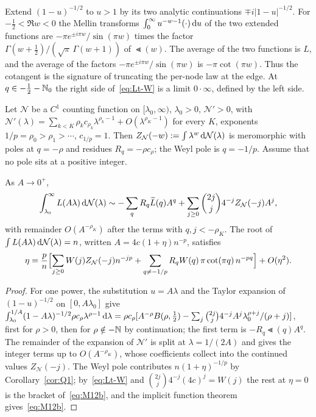 Extend $(1-u)^{-1/2}$ to $u>1$ by its two analytic continuations $\mp i|1-u|^{-1/2}$. For $-\frac12<\Re w<0$ the Mellin transforms
$\int_0^\infty u^{-w-1}(\cdot)\,\mathrm{d} u$ of the two extended functions are $-\pi e^{\pm i\pi w}/\sin(\pi w)$ times the factor
$\Gamma(w+\frac12)/(\sqrt\pi\,\Gamma(w+1))$ of $\Lt(w)$. The average of the two functions is $L$, and the average of the factors
$-\pi e^{\pm i\pi w}/\sin(\pi w)$ is $-\pi\cot(\pi w)$. Thus the cotangent is the signature of truncating the per-node law at
the edge. At $q\in-\frac12-\mathbb{N}_0$ the right side of~\eqref{eq:Lt-W} is a limit $0\cdot\infty$, defined by the left side.

Let $\mathcal N$ be a $C^1$ counting function on $[\lambda_0,\infty)$, $\lambda_0>0$, $\mathcal N'>0$, with
$\mathcal N'(\lambda)=\sum_{k<K}\rho_kc_{\rho_k}\lambda^{\rho_k-1}+O(\lambda^{\rho_K-1})$ for every $K$, exponents $1/p=\rho_0>\rho_1>\dotsb$,
$c_{1/p}=1$. Then $Z_{\mathcal N}(-w):=\int\lambda^w\,\mathrm{d}\mathcal N(\lambda)$ is meromorphic with poles at $q=-\rho$ and residues $R_q=-\rho c_\rho$;
the Weyl pole is $q=-1/p$. Assume that no pole sits at a positive integer.

\begin{proposition}\label{prop:M12}
As $A\to0^+$,
\begin{equation}\label{eq:M12a}
  \int_{\lambda_0}^\infty L(A\lambda)\,\mathrm{d}\mathcal N(\lambda)\sim-\sum_qR_q\widetilde L(q)A^q+\sum_{j\ge0}\binom{2j}j4^{-j}Z_{\mathcal N}(-j)A^j,
\end{equation}
with remainder $O(A^{-\rho_K})$ after the terms with $q,j<-\rho_K$. The root of $\int L(A\lambda)\,\mathrm{d}\mathcal N(\lambda)=n$, written
$A=4c(1+\eta)n^{-p}$, satisfies
\begin{equation}\label{eq:M12b}
  \eta=\frac pn\Bigl[\sum_{j\ge0}W(j)Z_{\mathcal N}(-j)n^{-jp}+\sum_{q\ne-1/p}R_qW(q)\,\pi\cot(\pi q)\,n^{-pq}\Bigr]+O(\eta^2).
\end{equation}
\end{proposition}

\begin{proof}
For one power, the substitution $u=A\lambda$ and the Taylor expansion of $(1-u)^{-1/2}$ on $[0,A\lambda_0]$ give
$\int_{\lambda_0}^{1/A}(1-A\lambda)^{-1/2}\rho c_\rho\lambda^{\rho-1}\,\mathrm{d}\lambda=\rho c_\rho[A^{-\rho}B(\rho,\frac12)-\sum_j\binom{2j}j4^{-j}A^j\lambda_0^{\rho+j}/(\rho+j)]$,
first for $\rho>0$, then for $\rho\notin-\mathbb{N}$ by continuation; the first term is $-R_q\Lt(q)A^q$. The remainder of the expansion of $\mathcal N'$
is split at $\lambda=1/(2A)$ and gives the integer terms up to $O(A^{-\rho_K})$, whose coefficients collect into the continued values
$Z_{\mathcal N}(-j)$. The Weyl pole contributes $n(1+\eta)^{-1/p}$ by Corollary~\ref{cor:Q1}; by~\eqref{eq:Lt-W} and
$\binom{2j}j4^{-j}(4c)^j=W(j)$ the rest at $\eta=0$ is the bracket of~\eqref{eq:M12b}, and the implicit function theorem gives~\eqref{eq:M12b}.
\end{proof}

